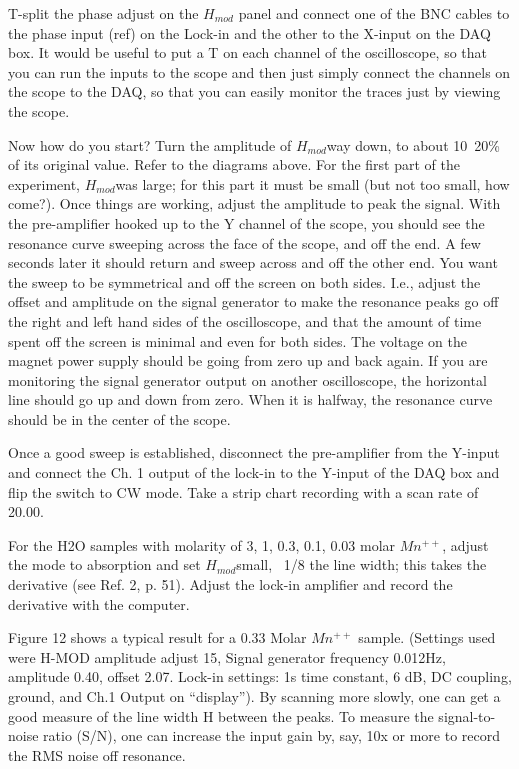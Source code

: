 \documentclass{../lab}
\begin{document}
T-split the phase adjust on the $H_{mod}$  panel and connect one of the BNC cables to the phase input (ref) on the Lock-in and the other to the X-input on the DAQ box. It would be useful to put a T on each channel of the oscilloscope, so that you can run the inputs to the scope and then just simply connect the channels on the scope to the DAQ, so that you can easily monitor the traces just by viewing the scope.

Now how do you start? Turn the amplitude of $H_{mod}$way down, to about 10~20\% of its original value. Refer to the diagrams above. For the first part of the experiment, $H_{mod}$was large; for this part it must be small (but not too small, how come?). Once things are working, adjust the amplitude to peak the signal. With the pre-amplifier hooked up to the Y channel of the scope, you should see the resonance curve sweeping across the face of the scope, and off the end. A few seconds later it should return and sweep across and off the other end. You want the sweep to be symmetrical and off the screen on both sides. I.e., adjust the offset and amplitude on the signal generator to make the resonance peaks go off the right and left hand sides of the oscilloscope, and that the amount of time spent off the screen is minimal and even for both sides. The voltage on the magnet power supply should be going from zero up and back again. If you are monitoring the signal generator output on another oscilloscope, the horizontal line should go up and down from zero. When it is halfway, the resonance curve should be in the center of the scope.

Once a good sweep is established, disconnect the pre-amplifier from the Y-input and connect the Ch. 1 output of the lock-in to the Y-input of the DAQ box and flip the switch to CW mode. Take a strip chart recording with a scan rate of 20.00.

For the H2O samples with molarity of 3, 1, 0.3, 0.1, 0.03 molar $Mn^{++}$, adjust the mode to absorption and set $H_{mod}$small, ~1/8 the line width; this takes the derivative (see Ref. 2, p. 51). Adjust the lock-in amplifier and record the derivative with the computer.

Figure 12 shows a typical result for a 0.33 Molar  $Mn^{++}$ sample.  (Settings used were H-MOD amplitude adjust 15, Signal generator frequency 0.012Hz, amplitude 0.40, offset 2.07. Lock-in settings: 1s time constant, 6 dB, DC coupling, ground, and Ch.1 Output on ``display''). By scanning more slowly, one can get a good measure of the line width H between the peaks. To measure the signal-to-noise ratio (S/N), one can increase the input gain by, say, 10x or more to record the RMS noise off resonance.
\end{document}
